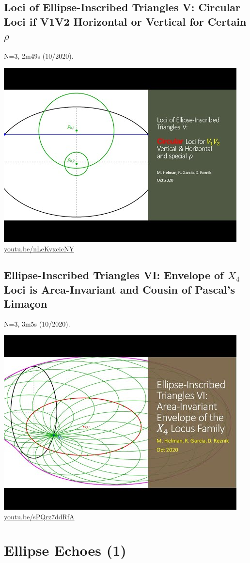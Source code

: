 \documentclass[12pt]{amsart}
\begin{document}
\subsection{Loci of Ellipse-Inscribed Triangles V: Circular Loci if V1V2 Horizontal or Vertical for Certain $\rho$}
\label{vid:nLeKvxcicNY}
\noindent N=3, 2m49s (10/2020). 
\begin{center}\includegraphics[width=.5\textwidth]{pics/nLeKvxcicNY.jpg} \\ 
\href{https://youtu.be/nLeKvxcicNY}{\url{youtu.be/nLeKvxcicNY}}\end{center}
% 
\subsection{Ellipse-Inscribed Triangles VI: Envelope of $X_{4}$ Loci is Area-Invariant and Cousin of Pascal's Limaçon}
\label{vid:sPQrz7ddRfA}
\noindent N=3, 3m5s (10/2020). 
\begin{center}\includegraphics[width=.5\textwidth]{pics/sPQrz7ddRfA.jpg} \\ 
\href{https://youtu.be/sPQrz7ddRfA}{\url{youtu.be/sPQrz7ddRfA}}\end{center}
% 

\section{Ellipse Echoes (1)}
\end{document}
